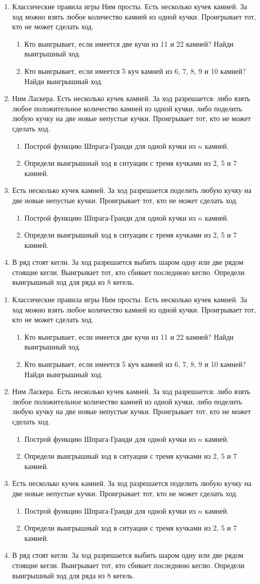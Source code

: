 \documentclass[12pt]{article}
\theoremstyle{definition}
\begin{document}
\newcommand{\daytwo}{
\begin{enumerate}
  \item Классические правила игры Ним просты. Есть несколько кучек камней. За ход можно взять любое
  количество камней из одной кучки. Проигрывает тот, кто не может сделать ход.
  \begin{enumerate}
    \item Кто выигрывает, если имеется две кучи из 11 и 22 камней? Найди выигрышный ход.
    \item Кто выигрывает, если имеется 5 куч камней из 6, 7, 8, 9 и 10 камней? Найди выигрышный ход.
  \end{enumerate}
  \item Ним Ласкера. Есть несколько кучек камней. За ход разрешается: либо взять любое положительное количество
  камней из одной кучки, либо поделить любую кучку на две новые непустые кучки. Проигрывает
  тот, кто не может сделать ход.
  \begin{enumerate}
    \item Построй функцию Шпрага-Гранди для одной кучки из $n$ камней.
    \item Определи выигрышный ход в ситуации с тремя кучками из 2, 5 и 7 камней.
  \end{enumerate}
  \item Есть несколько кучек камней. За ход разрешается поделить любую кучку на две новые непустые кучки. 
  Проигрывает тот, кто не может сделать ход.
  \begin{enumerate}
    \item Построй функцию Шпрага-Гранди для одной кучки из $n$ камней.
    \item Определи выигрышный ход в ситуации с тремя кучками из 2, 5 и 7 камней.
  \end{enumerate}
  \item В ряд стоят кегли. За ход разрешается выбить шаром одну или две рядом стоящие кегли. 
  Выигрывает тот, кто сбивает последнюю кеглю.
  Определи выигрышный ход для ряда из 8 кегель. 
  
\end{enumerate}
}
\newpage
\daytwo
\vfill
\daytwo
\newpage
\end{document}
